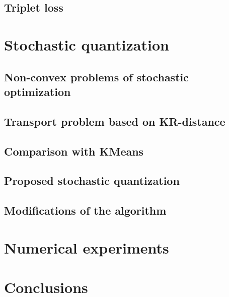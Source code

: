 \documentclass{ceurart}
\begin{document}
\subsection{Triplet loss}

\section{Stochastic quantization}

\subsection{Non-convex problems of stochastic optimization}

\subsection{Transport problem based on KR-distance}

\subsection{Comparison with KMeans}

\subsection{Proposed stochastic quantization}

\subsection{Modifications of the algorithm}

\section{Numerical experiments}

\section{Conclusions}


\end{document}
